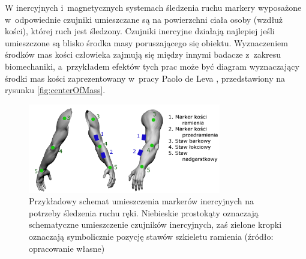W inercyjnych i~magnetycznych systemach śledzenia ruchu markery wyposażone w~odpowiednie czujniki umieszczane są na powierzchni ciała osoby (wzdłuż kości), której ruch jest śledzony. Czujniki inercyjne działają najlepiej jeśli umieszczone są blisko środka masy poruszającego się obiektu. Wyznaczeniem środków mas kości człowieka zajmują się między innymi badacze z~zakresu biomechaniki, a~przykładem efektów tych prac może być diagram wyznaczający środki mas kości zaprezentowany w~pracy Paolo de Leva \cite{DeLeva1996}, przedstawiony na rysunku \ref{fig:centerOfMass}.
																					
\begin{savenotes}
	\begin{figure}[!htb]
		\centering	
		\includegraphics[width=0.75\textwidth]{images/imuArm.png}
		\caption[Przykładowy schemat umieszczenia markerów inercyjnych na potrzeby śledzenia ruchu ręki]{Przykładowy schemat umieszczenia markerów inercyjnych na potrzeby śledzenia ruchu ręki. Niebieskie prostokąty oznaczają schematyczne umieszczenie czujników inercyjnych, zaś zielone kropki oznaczają symbolicznie pozycję stawów szkieletu ramienia (źródło: opracowanie własne)}
		\label{fig:literature:imuMarkerPlacementSample}
	\end{figure}
\end{savenotes}
																							
